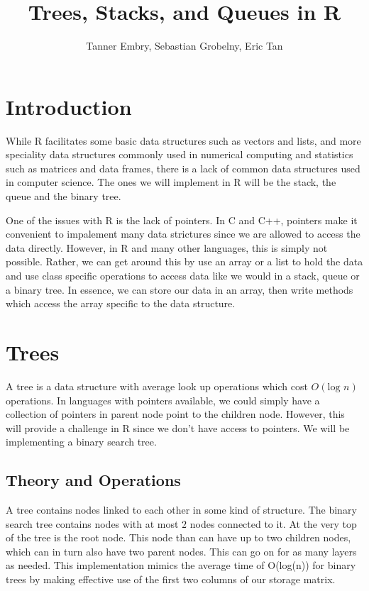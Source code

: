 \documentclass[11pt]{article}
\title{Trees, Stacks, and Queues in R}
\author{Tanner Embry, Sebastian Grobelny, Eric Tan}
\date
\begin{document}
\maketitle

\section{Introduction} \label{intro}
While R facilitates some basic data structures such as vectors and lists, and more speciality data structures commonly used in numerical computing and statistics such as matrices and data frames, there is a lack of common data structures used in computer science. The ones we will implement in R will be the stack, the queue and the binary tree.

One of the issues with R is the lack of pointers. In C and C++, pointers make it convenient to impalement many data strictures since we are allowed to access the data directly. However, in R and many other languages, this is simply not possible. Rather, we can get around this by use an array or a list to hold the data and use class specific operations to access data like we would in a stack, queue or a binary tree. In essence, we can store our data in an array, then write methods which access the array specific to the data structure.

\section{Trees} \label{trees}
A tree is a data structure with average look up operations which cost $O(\text{log } n)$ operations. In languages with pointers available, we could simply have a collection of pointers in parent node point to the children node. However, this will provide a challenge in R since we don't have access to pointers. We will be implementing a binary search tree.
\subsection{Theory and Operations} \label{trees:theory}
A tree contains nodes linked to each other in some kind of structure. The binary search tree contains nodes with at most $2$ nodes connected to it. At the very top of the tree is the root node. This node than can have up to two children nodes, which can in turn also have two parent nodes. This can go on for as many layers as needed. This implementation mimics the average time of  O(log(n)) for binary trees by making effective use of the first two columns of our storage matrix.
\end{document}

